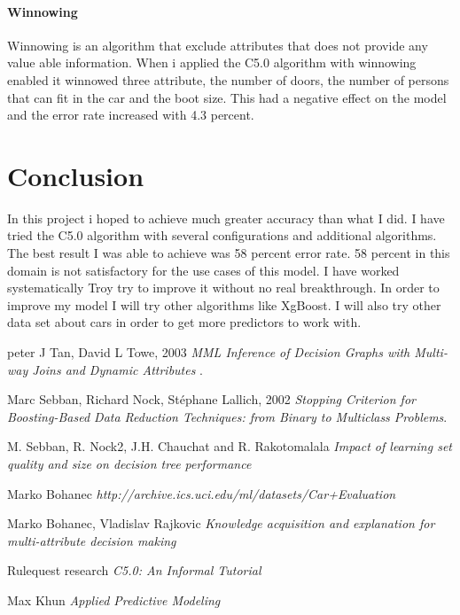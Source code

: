 \documentclass[a4paper, 12pt]{article}
\begin{document}
\paragraph{Winnowing}
Winnowing is an algorithm that exclude attributes that does not provide any value able information. When i applied the C5.0 algorithm with winnowing enabled it winnowed three attribute, the number of doors, the number of persons that can fit in the car and the boot size. This had a negative effect on the model and the error rate increased with 4.3 percent.


\section{Conclusion}
In this project i hoped to achieve much greater accuracy than what I did. I have tried the C5.0 algorithm with several configurations and additional algorithms. The best result I was able to achieve was 58 percent error rate. 58 percent in this domain is not satisfactory for the use cases of this model. I have worked systematically Troy try to improve it without no real breakthrough. In order to improve my model I will try other algorithms like XgBoost. I will also try other data set about cars in order to get more predictors to work with. 
\clearpage
\begin{thebibliography}{9}
peter J Tan, David L Towe, 2003
\textit{MML Inference of Decision Graphs with Multi-way Joins and Dynamic Attributes
}.

  Marc Sebban, Richard Nock, Stéphane Lallich, 2002
  \textit{Stopping Criterion for Boosting-Based Data Reduction Techniques: from Binary to Multiclass Problems}.

  M. Sebban, R. Nock2, J.H. Chauchat and R. Rakotomalala
  \textit{Impact of learning set quality and size on decision tree performance}

  Marko Bohanec
  \textit{http://archive.ics.uci.edu/ml/datasets/Car+Evaluation}

  Marko Bohanec, Vladislav Rajkovic
  \textit{Knowledge acquisition and explanation for multi-attribute decision making}

  Rulequest research
  \textit{C5.0: An Informal Tutorial}

  Max Khun
  \textit{Applied Predictive Modeling}


 
\end{thebibliography}
\end{document}
